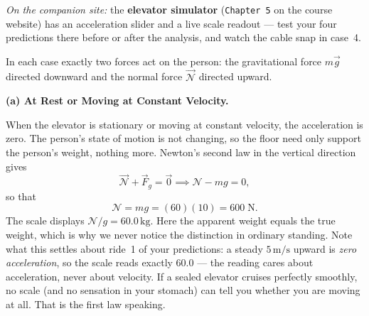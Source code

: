 \noindent\textit{On the companion site:} the \textbf{elevator simulator}
(\texttt{Chapter 5} on the course website) has an acceleration slider and a
live scale readout --- test your four predictions there before or after the
analysis, and watch the cable snap in case~4.

In each case exactly two forces act on the person: the gravitational force $m\vec{g}$
directed downward and the normal force $\vec{\mathscr{N}}$ directed upward.
 
\vspace{0.3cm}
\noindent\textbf{\sffamily(a)\; At Rest or Moving at Constant Velocity.}
 
\begin{minipage}[t]{0.55\textwidth}
\vspace{0pt}
When the elevator is stationary or moving at constant velocity, the acceleration is zero.
The person's state of motion is not changing, so the floor need only support the person's
weight, nothing more. Newton's second law in the vertical direction gives
\begin{equation*}
    \vec{\mathscr{N}} + \vec{F}_g = \vec{0}
    \implies \mathscr{N} - mg = 0,
\end{equation*}
so that
\begin{equation*}
    \mathscr{N} = mg = (60)(10) = 600\;\mathrm{N}.
\end{equation*}
The scale displays $\mathscr{N}/g = 60.0\,\mathrm{kg}$. Here the apparent weight equals the
true weight, which is why we never notice the distinction in ordinary standing.
Note what this settles about ride~1 of your predictions: a steady
$5\,\mathrm{m/s}$ upward is \emph{zero acceleration}, so the scale reads
exactly 60.0 --- the reading cares about acceleration, never about velocity.
If a sealed elevator cruises perfectly smoothly, no scale (and no sensation
in your stomach) can tell you whether you are moving at all. That is the
first law speaking.
\end{minipage}
\hfill
\begin{minipage}[t]{0.6\textwidth}
\vspace{0pt}
\centering
{}
\label{fig:scale}
\end{minipage}

